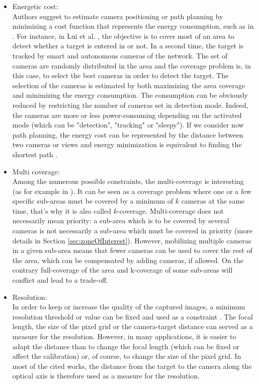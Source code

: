 \begin{itemize}
\item  Energetic cost:
\\ Authors suggest to estimate camera positioning or path planning by minimizing a cost function that represents the energy consumption, such as in  \cite{38*liu2010,42*bulusu2001}. For instance, in Lui et al. \cite{38*liu2010}, the  objective is to cover most of an area to detect whether a target is entered in or not. In a second time, the target is tracked by smart and autonomous cameras of the network. The set of cameras are randomly distributed in the area and the coverage problem is, in this case, to select the best cameras in order to detect the target. The selection of the cameras is estimated by both maximizing the area coverage and minimizing the energy consumption. The consumption can be obviously reduced by restricting the number of cameras set in detection mode. Indeed, the cameras are more or less power-consuming depending on the activated mode (which can be "detection", "tracking" or "sleepy"). If we consider now path planning, the energy cost can be represented by the distance between two cameras or views and energy minimization is equivalent to finding the shortest path \cite{191*di2016,218*meiting2007}.  
\\
\item Multi coverage:\\
 Among the numerous possible constraints, the multi-coverage is interesting (as for example in \cite{149*mavrinac2013,151*zhao2013,152*wang2009,174*zhang2016,175*medhi2013}). It can be seen as a coverage problem where one or a few specific sub-areas must be covered by a minimum of $k$ cameras at the  same time, that's why it is also called $k$-coverage. Multi-coverage does not necessarily mean priority: a sub-area which is to be covered by several cameras is not necessarily a sub-area which must be covered in priority (more details in Section \ref{sec:zoneOfInterest}). However, mobilizing multiple cameras in a given sub-area means that fewer cameras can be used to cover the rest of the area, which can be compensated by adding cameras, if allowed. On the contrary full-coverage of the area and k-coverage of some sub-areas will conflict and lead to a trade-off. 
\\ 
\item  Resolution:\\ In order to keep or increase the quality of the captured images, a minimum resolution threshold or value can be fixed and used as a constraint \cite{27*bodor2005,33*reddy2012,171*horster2006,152*wang2009,43*erdem2006}. The focal length, the size of the pixel grid or the camera-target distance can served as a measure for the resolution. However, in many applications, it is easier to adapt the distance than to change the focal length (which can be fixed or affect the calibration) or, of course, to change the size of the pixel grid. In most of the cited works, the distance from the target to the camera along the optical axis is therefore used as a measure for the resolution.\\

\end{itemize}
